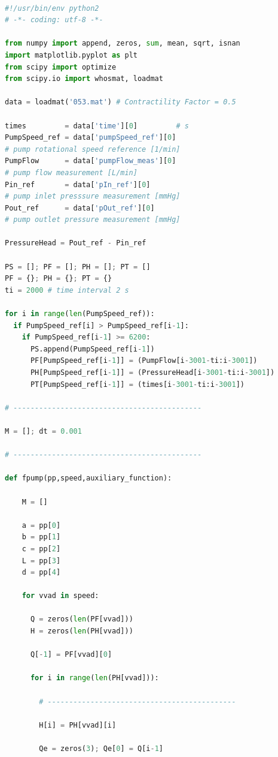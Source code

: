 \begin{lstlisting}[language=Python,caption={Процедура оптимизации на основе алгоритма дифференциальной эволюции на языке программирования Python},label={list:optimization_routine_diff}]

#!/usr/bin/env python2
# -*- coding: utf-8 -*-

from numpy import append, zeros, sum, mean, sqrt, isnan
import matplotlib.pyplot as plt
from scipy import optimize
from scipy.io import whosmat, loadmat

data = loadmat('053.mat') # Contractility Factor = 0.5

times         = data['time'][0]         # s
PumpSpeed_ref = data['pumpSpeed_ref'][0]    
# pump rotational speed reference [1/min]
PumpFlow      = data['pumpFlow_meas'][0]    
# pump flow measurement [L/min]
Pin_ref       = data['pIn_ref'][0]       
# pump inlet presssure measurement [mmHg]
Pout_ref      = data['pOut_ref'][0]      
# pump outlet pressure measurement [mmHg]

PressureHead = Pout_ref - Pin_ref

PS = []; PF = []; PH = []; PT = []
PF = {}; PH = {}; PT = {}
ti = 2000 # time interval 2 s

for i in range(len(PumpSpeed_ref)):
  if PumpSpeed_ref[i] > PumpSpeed_ref[i-1]:
    if PumpSpeed_ref[i-1] >= 6200:
      PS.append(PumpSpeed_ref[i-1])
      PF[PumpSpeed_ref[i-1]] = (PumpFlow[i-3001-ti:i-3001])
      PH[PumpSpeed_ref[i-1]] = (PressureHead[i-3001-ti:i-3001])
      PT[PumpSpeed_ref[i-1]] = (times[i-3001-ti:i-3001])

# --------------------------------------------

M = []; dt = 0.001

# --------------------------------------------

def fpump(pp,speed,auxiliary_function):

    M = []

    a = pp[0]
    b = pp[1]
    c = pp[2]
    L = pp[3]
    d = pp[4]

    for vvad in speed:

      Q = zeros(len(PF[vvad]))
      H = zeros(len(PH[vvad]))

      Q[-1] = PF[vvad][0]

      for i in range(len(PH[vvad])):

        # --------------------------------------------

        H[i] = PH[vvad][i]

        Qe = zeros(3); Qe[0] = Q[i-1] 


\end{lstlisting}
